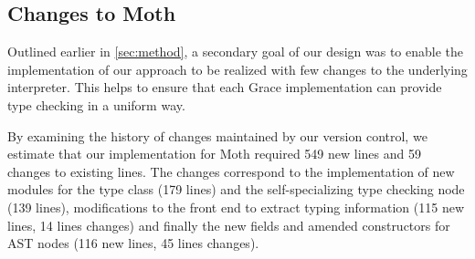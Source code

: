 \subsection{Changes to Moth}

Outlined earlier in \cref{sec:method}, a secondary
goal of our design was to enable the implementation of our approach to be
realized with few changes to the underlying interpreter.
This helps to ensure that each Grace implementation
can provide type checking in a uniform way.

By examining the history of changes maintained by our version control, 
we estimate that our implementation for Moth required
549 new lines and 59 changes to existing lines. 
The changes correspond to the implementation of 
new modules for the type class (179 lines) and 
the self-specializing type checking node (139 lines),
modifications to the front end to extract typing information
(115 new lines, 14 lines changes)
and finally the new fields and amended constructors for AST nodes 
(116 new lines, 45 lines changes).




